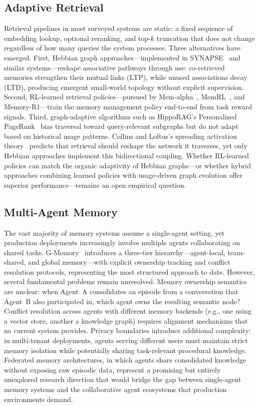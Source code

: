 \subsection{Adaptive Retrieval}

Retrieval pipelines in most surveyed systems are static: a fixed
sequence of embedding lookup, optional reranking, and top-$k$
truncation that does not change regardless of how many queries the
system processes. Three alternatives have emerged. First, Hebbian
graph approaches---implemented in
SYNAPSE~\cite{jiang2026synapse} and similar systems---reshape associative pathways
through use: co-retrieved memories strengthen their mutual links
(LTP), while unused associations decay (LTD), producing emergent
small-world topology without explicit supervision. Second, RL-learned
retrieval policies---pursued by
Mem-alpha~\cite{wang2025memalpha},
MemRL~\cite{zhang2026memrl}, and Memory-R1---train the memory
management policy end-to-end from task reward signals. Third,
graph-adaptive algorithms such as HippoRAG's Personalized
PageRank~\cite{gutierrez2024hipporag} bias traversal toward
query-relevant subgraphs but do not adapt based on historical usage
patterns. Collins and Loftus's spreading activation
theory~\cite{collins1975} predicts that retrieval should reshape the
network it traverses, yet only Hebbian approaches implement this
bidirectional coupling. Whether RL-learned policies can match the
organic adaptivity of Hebbian graphs---or whether hybrid approaches
combining learned policies with usage-driven graph evolution offer
superior performance---remains an open empirical question.

\subsection{Multi-Agent Memory}

The vast majority of memory systems assume a single-agent setting, yet
production deployments increasingly involve multiple agents
collaborating on shared tasks. G-Memory~\cite{zhang2025gmemory}
introduces a three-tier hierarchy---agent-local, team-shared, and
global memory---with explicit ownership tracking and conflict
resolution protocols, representing the most structured approach to
date. However, several fundamental problems remain unresolved. Memory
ownership semantics are unclear: when Agent~A consolidates an episode
from a conversation that Agent~B also participated in, which agent
owns the resulting semantic node? Conflict resolution across agents
with different memory backends (e.g., one using a vector store,
another a knowledge graph) requires alignment mechanisms that no
current system provides. Privacy boundaries introduce additional
complexity: in multi-tenant deployments, agents serving different
users must maintain strict memory isolation while potentially sharing
task-relevant procedural knowledge. Federated memory architectures,
in which agents share consolidated knowledge without exposing raw
episodic data, represent a promising but entirely unexplored research
direction that would bridge the gap between single-agent memory
systems and the collaborative agent ecosystems that production
environments demand.

